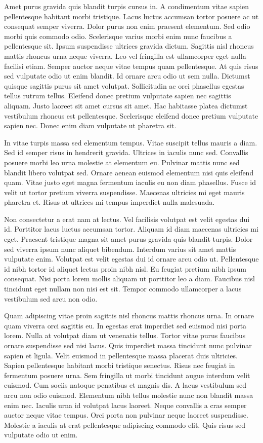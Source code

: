 \documentclass[11pt,a4paper]{article}
\begin{document}
Amet purus gravida quis blandit turpis cursus in. A condimentum vitae sapien pellentesque habitant morbi tristique. Lacus luctus accumsan tortor posuere ac ut consequat semper viverra. Dolor purus non enim praesent elementum. Sed odio morbi quis commodo odio. Scelerisque varius morbi enim nunc faucibus a pellentesque sit. Ipsum suspendisse ultrices gravida dictum. Sagittis nisl rhoncus mattis rhoncus urna neque viverra. Leo vel fringilla est ullamcorper eget nulla facilisi etiam. Semper auctor neque vitae tempus quam pellentesque. At quis risus sed vulputate odio ut enim blandit. Id ornare arcu odio ut sem nulla. Dictumst quisque sagittis purus sit amet volutpat. Sollicitudin ac orci phasellus egestas tellus rutrum tellus. Eleifend donec pretium vulputate sapien nec sagittis aliquam. Justo laoreet sit amet cursus sit amet. Hac habitasse platea dictumst vestibulum rhoncus est pellentesque. Scelerisque eleifend donec pretium vulputate sapien nec. Donec enim diam vulputate ut pharetra sit.

In vitae turpis massa sed elementum tempus. Vitae suscipit tellus mauris a diam. Sed id semper risus in hendrerit gravida. Ultrices in iaculis nunc sed. Convallis posuere morbi leo urna molestie at elementum eu. Pulvinar mattis nunc sed blandit libero volutpat sed. Ornare aenean euismod elementum nisi quis eleifend quam. Vitae justo eget magna fermentum iaculis eu non diam phasellus. Fusce id velit ut tortor pretium viverra suspendisse. Maecenas ultricies mi eget mauris pharetra et. Risus at ultrices mi tempus imperdiet nulla malesuada.

Non consectetur a erat nam at lectus. Vel facilisis volutpat est velit egestas dui id. Porttitor lacus luctus accumsan tortor. Aliquam id diam maecenas ultricies mi eget. Praesent tristique magna sit amet purus gravida quis blandit turpis. Dolor sed viverra ipsum nunc aliquet bibendum. Interdum varius sit amet mattis vulputate enim. Volutpat est velit egestas dui id ornare arcu odio ut. Pellentesque id nibh tortor id aliquet lectus proin nibh nisl. Eu feugiat pretium nibh ipsum consequat. Nisi porta lorem mollis aliquam ut porttitor leo a diam. Faucibus nisl tincidunt eget nullam non nisi est sit. Tempor commodo ullamcorper a lacus vestibulum sed arcu non odio.

Quam adipiscing vitae proin sagittis nisl rhoncus mattis rhoncus urna. In ornare quam viverra orci sagittis eu. In egestas erat imperdiet sed euismod nisi porta lorem. Nulla at volutpat diam ut venenatis tellus. Tortor vitae purus faucibus ornare suspendisse sed nisi lacus. Quis imperdiet massa tincidunt nunc pulvinar sapien et ligula. Velit euismod in pellentesque massa placerat duis ultricies. Sapien pellentesque habitant morbi tristique senectus. Risus nec feugiat in fermentum posuere urna. Sem fringilla ut morbi tincidunt augue interdum velit euismod. Cum sociis natoque penatibus et magnis dis. A lacus vestibulum sed arcu non odio euismod. Elementum nibh tellus molestie nunc non blandit massa enim nec. Iaculis urna id volutpat lacus laoreet. Neque convallis a cras semper auctor neque vitae tempus. Orci porta non pulvinar neque laoreet suspendisse. Molestie a iaculis at erat pellentesque adipiscing commodo elit. Quis risus sed vulputate odio ut enim.
\end{document}
